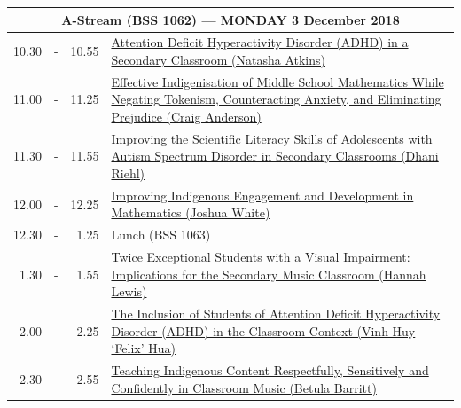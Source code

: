 \documentclass[twoside,12pt,a4paper,notitlepage]{memoir}
\begin{document}
\pagebreak
\begin{center}
\begin{tabular}{rcr|p{10.8cm}}
 \multicolumn{4}{c}{{\large A-Stream (BSS 1062) --- MONDAY 3 December 2018}} \\ \hline
 10.30 & - & 10.55 & 
 \hyperref[aut:atkins]{Attention Deficit Hyperactivity Disorder (ADHD) in a Secondary Classroom (Natasha Atkins)} \\ \hline
11.00 & - & 11.25 &
 \hyperref[aut:anderson]{Effective Indigenisation of Middle School Mathematics While Negating Tokenism, Counteracting Anxiety, and Eliminating Prejudice (Craig Anderson)} \\ \hline
11.30 & - & 11.55 &
 \hyperref[aut:riehl]{Improving the Scientific Literacy Skills of Adolescents with Autism Spectrum Disorder in Secondary Classrooms (Dhani Riehl)} \\ \hline
12.00 & - & 12.25 &
 \hyperref[aut:white]{Improving Indigenous Engagement and Development in Mathematics (Joshua White)} \\ \hline
12.30 & - & 1.25 & Lunch (BSS 1063) \\ \hline
1.30 & - & 1.55 &
 \hyperref[aut:lewis]{Twice Exceptional Students with a Visual Impairment: Implications for the Secondary Music Classroom (Hannah Lewis)} \\ \hline
2.00 & - & 2.25 &
 \hyperref[aut:hua]{The Inclusion of Students of Attention Deficit Hyperactivity Disorder (ADHD) in the Classroom Context (Vinh-Huy `Felix' Hua)} \\ \hline
2.30 & - & 2.55 &
 \hyperref[aut:barritt]{Teaching Indigenous Content Respectfully, Sensitively and Confidently in Classroom Music (Betula Barritt)} \\ \hline
\end{tabular}
\end{center}
\end{document}
